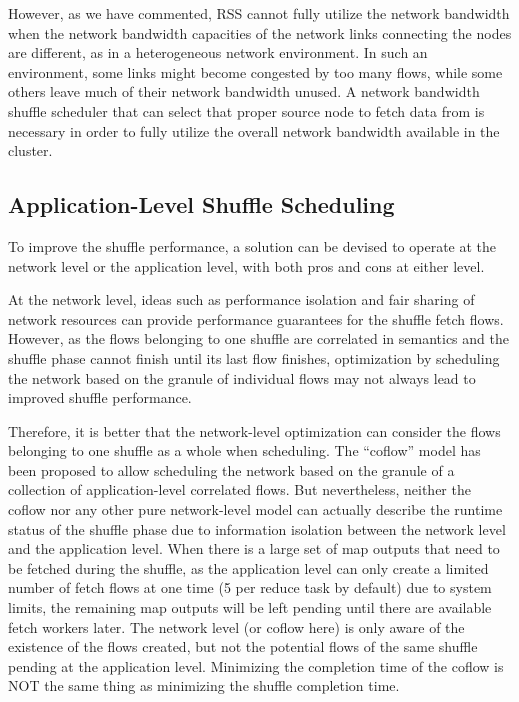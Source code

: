 \documentclass[10pt,journal,compsoc]{IEEEtran}
\begin{document}
However, as we have commented,
RSS cannot fully utilize the network bandwidth
when the network bandwidth capacities of
the network links connecting the nodes are different, as in
a heterogeneous network environment.
In such an environment, some links might become congested by too many flows,
while some others leave much of their network bandwidth unused.
A network bandwidth shuffle scheduler that can select that proper
source node to fetch data from is necessary in order
to fully utilize the overall network bandwidth available in the cluster. 


\subsection{Application-Level Shuffle Scheduling}\label{section:application_level}
To improve the shuffle performance, a solution can be devised to operate at the network level or the application level, with both pros and cons
at either level. 

At the network level, ideas such as
performance isolation \cite{greenberg2009vl2}
and fair sharing of network resources \cite{shieh2011sharing,popa2012faircloud} 
can provide performance guarantees for the shuffle fetch flows.
However, as the flows belonging to one shuffle are correlated in
semantics and the shuffle phase cannot finish until its last flow
finishes, optimization by scheduling the network based on the granule of
individual flows may not always lead to improved shuffle performance.

Therefore, it is better that the network-level optimization can
consider the flows belonging to one shuffle as a whole when
scheduling.
The ``coflow'' model \cite{chowdhury2014efficient,
chowdhury2015efficient} has been proposed to allow scheduling the network based on
the granule of a collection of application-level correlated flows.
But nevertheless, neither the coflow nor any other pure network-level
model can actually describe the runtime status of the shuffle phase
due to information isolation between the network level and the
application level.
When there is a large set of map outputs that need to be fetched during
the shuffle, as the application level can only create a limited number
of fetch flows at one time (5 per reduce task by default)
due to system limits,
the remaining map outputs will be left pending until there are available
fetch workers later. 
The network level (or coflow here) is only aware of the existence of
the flows created, but not the potential flows of the same shuffle
pending at the application level.
Minimizing the completion time of the coflow is NOT the same thing as
minimizing the shuffle completion time.
\end{document}
